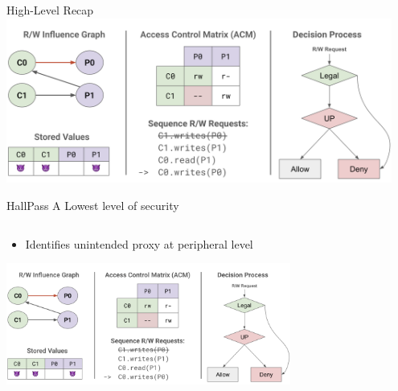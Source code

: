 \begin{frame}{High-Level Recap}
    \centering
    \includegraphics[height=0.95\textheight,width=0.95\textwidth,keepaspectratio]{images/hallpass_a.png}
\end{frame}

\begin{frame}{HallPass A}
    Lowest level of security 
    \begin{columns}
        \begin{column}{0.5\textwidth}
            \begin{itemize}
                \item Identifies unintended proxy at peripheral level
            \end{itemize}
            \centering
            \includegraphics[height=0.7\textheight,width=0.7\textwidth,keepaspectratio]{images/hallpass_a.png}
        \end{column}
    \end{columns}
\end{frame}

